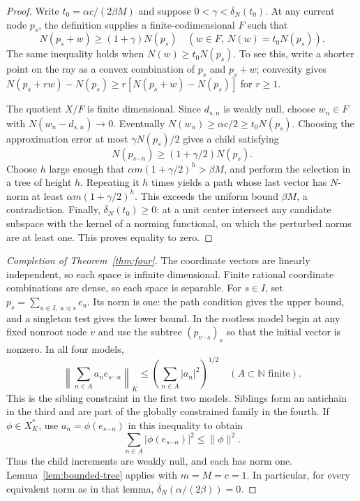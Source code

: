 \begin{proof}
Write $t_0=\alpha c/(2\beta M)$ and suppose
$0<\gamma<\overline\delta_N(t_0)$. At any current node $p_s$, the
definition supplies a finite-codimensional $F$ such that
\[
 N(p_s+w)\ge(1+\gamma)N(p_s)
 \quad(w\in F,\ N(w)=t_0N(p_s)).
\]
The same inequality holds when $N(w)\ge t_0N(p_s)$. To see this,
write a shorter point on the ray as a convex combination of $p_s$ and
$p_s+w$; convexity gives
$N(p_s+rw)-N(p_s)\ge r[N(p_s+w)-N(p_s)]$ for $r\ge1$.

The quotient $X/F$ is finite dimensional. Since $d_{s,n}$ is weakly
null, choose $w_n\in F$ with $N(w_n-d_{s,n})\to0$. Eventually
$N(w_n)\ge\alpha c/2\ge t_0N(p_s)$. Choosing the approximation error
at most $\gamma N(p_s)/2$ gives a child satisfying
\[
 N(p_{s^\frown n})\ge(1+\gamma/2)N(p_s).
\]
Choose $h$ large enough that $\alpha m(1+\gamma/2)^h>\beta M$,
and perform the selection in a tree of height $h$. Repeating it $h$ times
yields a path whose last vector has
$N$-norm at least $\alpha m(1+\gamma/2)^h$. This exceeds the uniform bound $\beta M$, a contradiction. Finally,
$\overline\delta_N(t_0)\ge0$: at a unit center intersect any candidate
subspace with the kernel of a norming functional, on which the
perturbed norms are at least one. This proves equality to zero.
\end{proof}

\begin{proof}[Completion of Theorem~\ref{thm:four}]
The coordinate vectors are linearly independent, so each space is
infinite dimensional. Finite rational coordinate combinations are dense,
so each space is separable. For $s\in I$, set
$p_s=\sum_{u\in I,\ u\preceq s}e_u$. Its norm is one: the path
condition gives the upper bound, and a singleton test gives the lower
bound. In the rootless model begin at any fixed nonroot node $v$ and
use the subtree $(p_{v^\frown s})_s$ so that the initial vector is
nonzero. In all four models,
\[
 \left\|\sum_{n\in A}a_ne_{s^\frown n}\right\|_K
 \le\left(\sum_{n\in A}|a_n|^2\right)^{1/2}
 \quad(A\subset\mathbb N\text{ finite}).
\]
This is the sibling constraint in the first two models. Siblings form
an antichain in the third and are part of the globally constrained
family in the fourth. If $\phi\in X_K^*$, use
$a_n=\phi(e_{s^\frown n})$ in this inequality to obtain
\[
 \sum_{n\in A}|\phi(e_{s^\frown n})|^2\le\|\phi\|^2.
\]
Thus the child increments are weakly null, and each has norm one.
Lemma~\ref{lem:bounded-tree} applies with $m=M=c=1$. In particular,
for every equivalent norm as in that lemma,
$\overline\delta_N(\alpha/(2\beta))=0$.
\end{proof}
